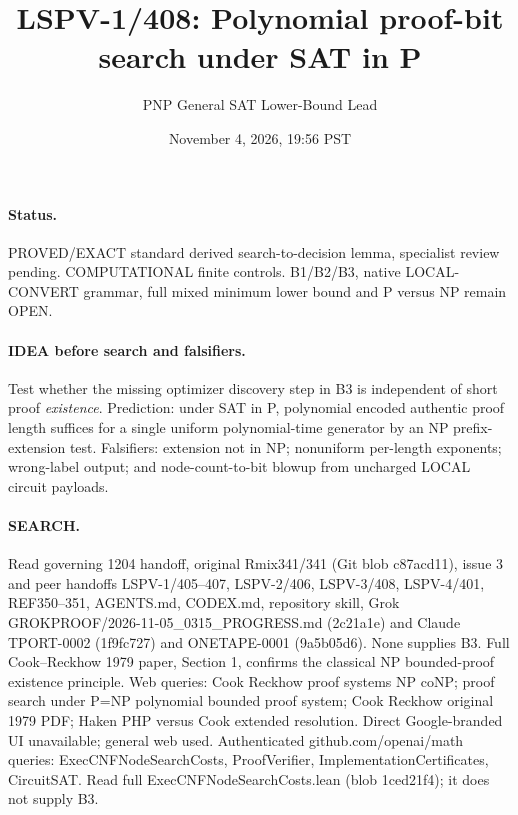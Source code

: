 \documentclass[11pt]{article}
\title{LSPV-1/408: Polynomial proof-bit search under SAT in P}
\author{PNP General SAT Lower-Bound Lead}
\date{November 4, 2026, 19:56 PST}
\begin{document}
\maketitle
\paragraph{Status.} PROVED/EXACT standard derived search-to-decision lemma, specialist review pending. COMPUTATIONAL finite controls. B1/B2/B3, native LOCAL-CONVERT grammar, full mixed minimum lower bound and P versus NP remain OPEN.
\paragraph{IDEA before search and falsifiers.} Test whether the missing optimizer discovery step in B3 is independent of short proof \emph{existence}. Prediction: under SAT in P, polynomial encoded authentic proof length suffices for a single uniform polynomial-time generator by an NP prefix-extension test. Falsifiers: extension not in NP; nonuniform per-length exponents; wrong-label output; and node-count-to-bit blowup from uncharged LOCAL circuit payloads.
\paragraph{SEARCH.} Read governing 1204 handoff, original Rmix341/341 (Git blob c87acd11), issue 3 and peer handoffs LSPV-1/405--407, LSPV-2/406, LSPV-3/408, LSPV-4/401, REF350--351, AGENTS.md, CODEX.md, repository skill, Grok GROKPROOF/2026-11-05\_0315\_PROGRESS.md (2c21a1e) and Claude TPORT-0002 (1f9fc727) and ONETAPE-0001 (9a5b05d6). None supplies B3. Full Cook--Reckhow 1979 paper, Section 1, confirms the classical NP bounded-proof existence principle. Web queries: Cook Reckhow proof systems NP coNP; proof search under P=NP polynomial bounded proof system; Cook Reckhow original 1979 PDF; Haken PHP versus Cook extended resolution. Direct Google-branded UI unavailable; general web used. Authenticated github.com/openai/math queries: ExecCNFNodeSearchCosts, ProofVerifier, ImplementationCertificates, CircuitSAT. Read full ExecCNFNodeSearchCosts.lean (blob 1ced21f4); it does not supply B3.
\end{document}
